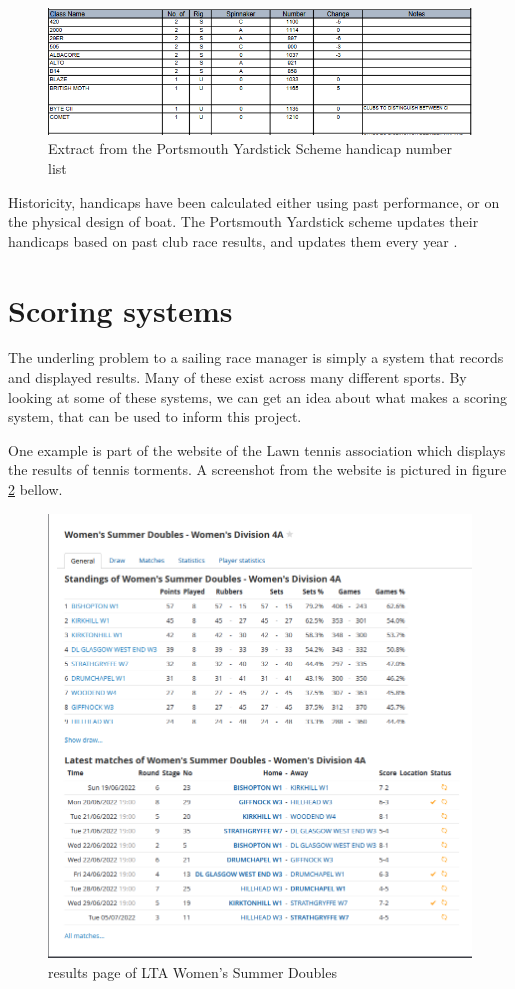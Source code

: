\documentclass{l4proj}
\begin{document}
\begin{figure}[h!]
    \centering
    \includegraphics[width=0.6\linewidth]{images/Handicaps.png} 

    \caption{Extract from the Portsmouth Yardstick Scheme handicap number list \citep{RYApy}
    }

    \label{fig:Hanicaps} 
\end{figure}

Historicity, handicaps have been calculated either using past performance, or on the physical design of boat. The Portsmouth Yardstick scheme updates their handicaps based on past club race results, and updates them every year \citep{hanicaps}.

\section{Scoring systems}
The underling problem to a sailing race manager is simply a system that records and displayed results. Many of these exist across many different sports. By looking at some of these systems, we can get an idea about what makes a scoring system, that can be used to inform this project.

One example is part of the website of the Lawn tennis association \citet{Tennis} which displays the results of tennis torments. A screenshot from the website is pictured in figure \ref{fig:Tennis} bellow.

\begin{figure}[h!]
    \centering
    \includegraphics[width=0.6\linewidth]{images/Tennis systme.png} 

    \caption{results page of LTA Women's Summer Doubles \citep{Tennis}
    }

    \label{fig:Tennis} 
\end{figure}
\end{document}
